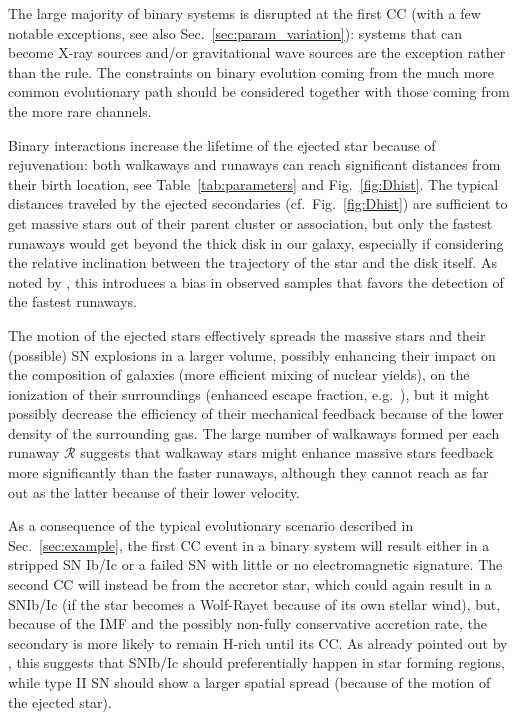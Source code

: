 \documentclass{aa}
\DeclareRobustCommand{\Figref}[1]{Fig.~\ref{#1}}
\DeclareRobustCommand{\Tabref}[1]{Table~\ref{#1}}
\DeclareRobustCommand{\Secref}[1]{Sec.~\ref{#1}}
\begin{document}
The large majority of binary systems is disrupted at the first CC
(with a few notable exceptions, see also \Secref{sec:param_variation}):
systems that can become X-ray sources and/or gravitational wave
sources are the exception rather than the rule. The constraints on binary evolution coming from the much more
common evolutionary path should be considered together with those
coming from the more rare channels.

Binary interactions increase the lifetime of the ejected star because
of rejuvenation: both walkaways
and runaways can reach significant distances from their birth
location, see \Tabref{tab:parameters} and \Figref{fig:Dhist}. The typical distances traveled
by the ejected secondaries (cf.~\Figref{fig:Dhist}) are sufficient to
get massive stars out of their parent cluster or association, but only
the fastest runaways would get beyond the thick disk in our galaxy,
especially if considering the relative inclination between the
trajectory of the star and the disk itself. As noted by
\cite{boubert:18}, this introduces a bias in observed samples that
favors the detection of the fastest runaways.

The motion of the ejected stars
effectively spreads the massive stars and their (possible) SN explosions in a larger
volume, possibly enhancing their impact on the composition of galaxies (more efficient mixing of
nuclear yields), on the ionization of their surroundings (enhanced
escape fraction, e.g.~\citealt{conroy:12, kimm:14, ma:16}), but it might possibly
decrease the efficiency of their mechanical feedback because of the
lower density of the surrounding gas.
The large number of walkaways
formed per each runaway $\mathcal{R}$ suggests that walkaway stars might
enhance massive stars feedback more significantly than the faster runaways, although they cannot
reach as far out as the latter because of their lower velocity.

As a consequence of the typical evolutionary scenario
described in \Secref{sec:example}, the first CC event in a
binary system will result either in a stripped SN Ib/Ic or a failed SN
with little or no electromagnetic signature. The second CC will
instead be from the accretor star, which could again result in a
SNIb/Ic (if the star becomes a Wolf-Rayet because of its own stellar wind),
but, because of the IMF and the possibly non-fully conservative
accretion rate, the secondary is more likely to remain H-rich until
its CC. As already pointed out by
\cite{eldridge:11}, this suggests that SNIb/Ic should preferentially
happen in star forming regions, while type II SN should show a larger
spatial spread (because of the motion of the ejected star).
\end{document}

